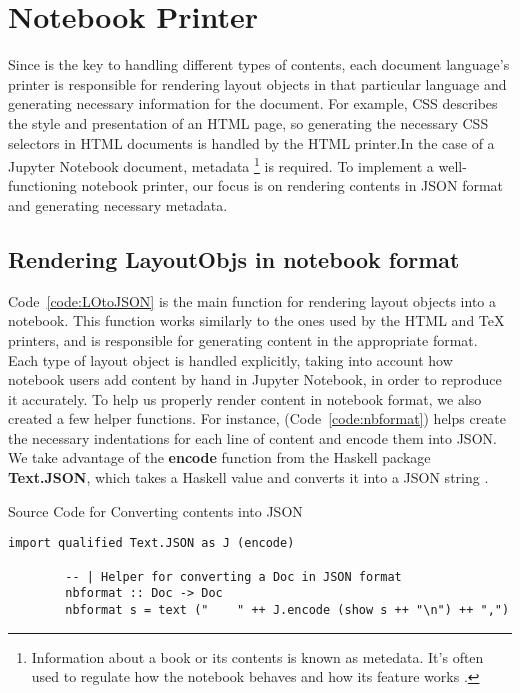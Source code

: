 \section{Notebook Printer}
Since  is the key to handling different types of contents, 
each document language's printer is responsible for rendering layout objects in 
that particular language and generating necessary information for the document. 
For example, CSS describes the style and presentation of an HTML page, so 
generating the necessary CSS selectors in HTML documents is handled by the HTML 
printer.In the case of a Jupyter Notebook document, metadata 
\footnote{Information about a book or its contents is known as metedata. It's 
often used to regulate how the notebook behaves and how its feature works 
\cite{notebookmetadata}.} is required. To implement a well-functioning notebook 
printer, our focus is on rendering contents in JSON format and generating 
necessary metadata.

\subsection{Rendering LayoutObjs in notebook format}
Code~\ref{code:LOtoJSON} is the main function for rendering layout objects into 
a notebook. This function works similarly to the ones used by the HTML and TeX
printers, and is responsible for generating content in the appropriate format. 
Each type of layout object is handled explicitly, taking into account how
notebook users add content by hand in Jupyter Notebook, in order to reproduce
it accurately. To help us properly render content in notebook format, we also 
created a few helper functions. For instance,  
(Code~\ref{code:nbformat}) helps create the necessary indentations for each 
line of content and encode them into JSON. We take advantage of the 
\textbf{encode} function from the Haskell package \textbf{Text.JSON}, which 
takes a Haskell value and converts it into a JSON string \cite{textdotjosn}. 

\begin{listing}[h]
	\caption{Source Code for Converting contents into JSON}
	\label{code:nbformat}
	\begin{lstlisting}[language=haskell1]
		import qualified Text.JSON as J (encode) 
		
		-- | Helper for converting a Doc in JSON format
		nbformat :: Doc -> Doc
		nbformat s = text ("    " ++ J.encode (show s ++ "\n") ++ ",")
	\end{lstlisting}
\end{listing}

